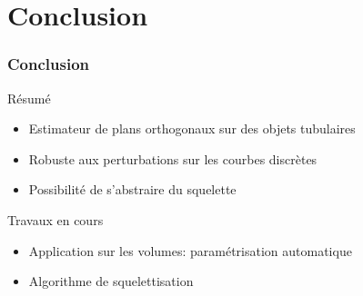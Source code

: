 \documentclass{beamer}
\begin{document}
\section{Conclusion}
\begin{frame}
	\frametitle{Conclusion}
	\begin{block}{Résumé}
		\begin{itemize}
			\item Estimateur de plans orthogonaux sur des objets tubulaires
			\item Robuste aux perturbations sur les courbes discrètes
			\item Possibilité de s'abstraire du squelette
		\end{itemize}		
	\end{block}
	
	\begin{block}{Travaux en cours}
		\begin{itemize}
			\item Application sur les volumes: paramétrisation automatique
			\item Algorithme de squelettisation
		\end{itemize}
		
	\end{block}
\end{frame}
\end{document}
